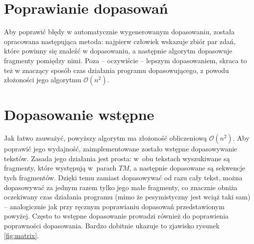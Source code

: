 \documentclass{pracamgr}
\begin{document}
\section{Poprawianie dopasowań}

Aby poprawić błędy w automatycznie wygenerowanym dopasowaniu, została
opracowana następująca metoda: najpierw człowiek wskazuje zbiór par
zdań, które powinny się znaleźć w dopasowaniu, a następnie algorytm
dopasowuje fragmenty pomiędzy nimi. Poza -- oczywiście -- lepszym
dopasowaniem, skraca to też w znaczący sposób czas działania programu
dopasowującego, z powodu złożoności jego algorytmu $\mathcal{O}(n^2)$.




\section{Dopasowanie wstępne}

Jak łatwo zauważyć, powyższy algorytm ma złożoność obliczeniową
$\mathcal{O}(n^2)$. Aby poprawić jego wydajność, zaimplementowane
zostało wstępne dopasowywanie tekstów. Zasada jego działania jest
prosta: w~obu tekstach wyszukiwane są fragmenty, które występują
w~parach $TM$, a następnie dopasowane są sekwencje tych
fragmentów. Dzięki temu zamiast dopasowywać od razu cały tekst, można
dopasowywać za jednym razem tylko jego małe fragmenty, co znacznie
obniża oczekiwany czas działania programu (mimo że pesymistyczny jest
wciąż taki sam) -- analogicznie jak przy ręcznym poprawianiu dopasowań
przedstawionym powyżej. Często to wstępne dopasowanie prowadzi również do
poprawienia poprawności dopasowania. Bardzo dobitnie ukazuje to
zjawisko rysunek \ref{fig:matrix}.
\end{document}
